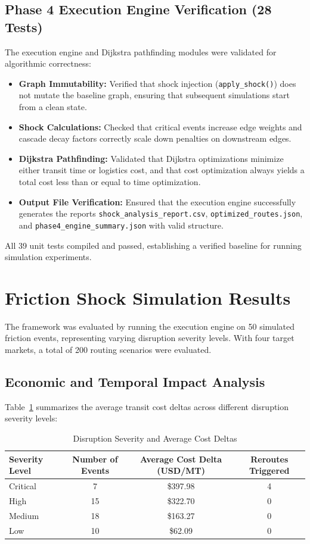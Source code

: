\subsection{Phase 4 Execution Engine Verification (28 Tests)}
The execution engine and Dijkstra pathfinding modules were validated for algorithmic correctness:
\begin{itemize}
    \item \textbf{Graph Immutability:} Verified that shock injection (\texttt{apply\_shock()}) does not mutate the baseline graph, ensuring that subsequent simulations start from a clean state.
    \item \textbf{Shock Calculations:} Checked that critical events increase edge weights and cascade decay factors correctly scale down penalties on downstream edges.
    \item \textbf{Dijkstra Pathfinding:} Validated that Dijkstra optimizations minimize either transit time or logistics cost, and that cost optimization always yields a total cost less than or equal to time optimization.
    \item \textbf{Output File Verification:} Ensured that the execution engine successfully generates the reports \texttt{shock\_analysis\_report.csv}, \texttt{optimized\_routes.json}, and \texttt{phase4\_engine\_summary.json} with valid structure.
\end{itemize}

All 39 unit tests compiled and passed, establishing a verified baseline for running simulation experiments.

\section{Friction Shock Simulation Results}
The framework was evaluated by running the execution engine on 50 simulated friction events, representing varying disruption severity levels. With four target markets, a total of 200 routing scenarios were evaluated. 

\subsection{Economic and Temporal Impact Analysis}
Table~\ref{c5:tab_severity} summarizes the average transit cost deltas across different disruption severity levels:

\begin{table}[htb]
\fontsize{10}{12}\selectfont
\centering
\caption{Disruption Severity and Average Cost Deltas}
\label{c5:tab_severity}
\begin{tabular}{|l|c|c|c|}
\hline
\textbf{Severity Level} & \textbf{Number of Events} & \textbf{Average Cost Delta (USD/MT)} & \textbf{Reroutes Triggered} \\
\hline
Critical & 7 & \$397.98 & 4 \\
High & 15 & \$322.70 & 0 \\
Medium & 18 & \$163.27 & 0 \\
Low & 10 & \$62.09 & 0 \\
\hline
\end{tabular}
\end{table}

